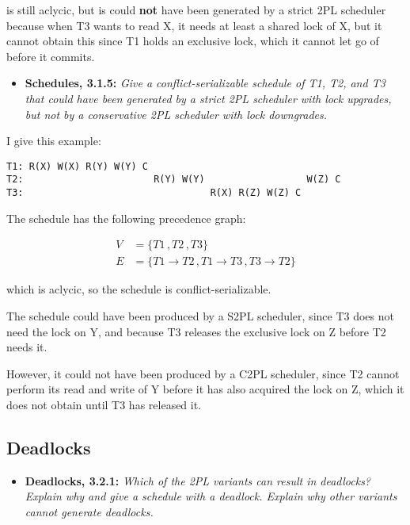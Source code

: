 is still aclycic, but is could \textbf{not} have been generated by a strict 2PL
scheduler because when T3 wants to read X, it needs at least a shared lock of X,
but it cannot obtain this since T1 holds an exclusive lock, which it cannot let
go of before it commits.

\begin{itemize}
  \item \textbf{Schedules, 3.1.5:}
    \textit{Give a conflict-serializable schedule of T1, T2, and T3 that could
    have been generated by a strict 2PL scheduler with lock
  upgrades, but not by a conservative 2PL scheduler with lock downgrades.}
\end{itemize}


I give this example:

\begin{verbatim}
T1: R(X) W(X) R(Y) W(Y) C
T2:                       R(Y) W(Y)                  W(Z) C
T3:                                 R(X) R(Z) W(Z) C
\end{verbatim}

The schedule has the following precedence graph:

\begin{align*}
  V &= \{T1\, , T2\, , T3\}\\
  E &= \{T1 \to T2\, , T1 \to T3\, , T3 \to T2\}
\end{align*}

which is aclycic, so the schedule is conflict-serializable.
\medskip

The schedule could have been produced by a S2PL scheduler, since T3 does not
need the lock on Y, and because T3 releases the exclusive lock on Z before T2
needs it. \medskip

However, it could not have been produced by a C2PL scheduler, since T2 cannot
perform its read and write of Y before it has also acquired the lock on Z, which
it does not obtain until T3 has released it.

\sectend

\subsection{Deadlocks}

\begin{itemize}
  \item \textbf{Deadlocks, 3.2.1:}
    \textit{Which of the 2PL variants can result in deadlocks? Explain why and
    give a schedule with a deadlock. Explain why other variants cannot generate
  deadlocks.}
\end{itemize}

